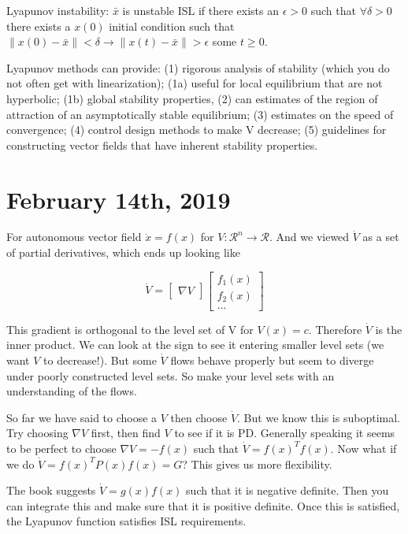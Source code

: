 \documentclass[11pt]{article}
\newcommand{\norm}[1]{\left\lVert#1\right\rVert}
\begin{document}
Lyapunov instability: $\bar{x}$ is unstable ISL if there exists an $\epsilon > 0$ such that $\forall \delta >0$  there exists a $x(0)$ initial condition such that $\norm{x(0) - \bar{x}}<\delta \rightarrow \norm{x(t) - \bar{x}} > \epsilon$ some $t\geq 0$. 

Lyapunov methods can provide: (1) rigorous analysis of stability (which you do not often get with linearization); (1a) useful for local equilibrium that are not hyperbolic; (1b) global stability properties, (2) can estimates of the region of attraction of an asymptotically stable equilibrium; (3) estimates on the speed of convergence; (4) control design methods to make V decrease; (5) guidelines for constructing vector fields that have inherent stability properties.




\section*{February 14th, 2019}
For autonomous vector field $\dot{x}=f(x)$ for $V:\mathcal{R}^n \rightarrow \mathcal{R}$. And we viewed $\dot{V}$ as a set of partial derivatives, which ends up looking like

\begin{equation}
\dot{V}=
\begin{bmatrix}
\nabla V
\end{bmatrix}
\begin{bmatrix}
f_1(x) \\
f_2(x) \\
...
\end{bmatrix}
\end{equation}

This gradient is orthogonal to the level set of V for $V(x)=c$. Therefore $\dot{V}$ is the inner product. We can look at the sign to see it entering smaller level sets (we want $V$ to decrease!). But some $\dot{V}$ flows behave properly but seem to diverge under poorly constructed level sets. So make your level sets with an understanding of the flows.

So far we have said to choose a $V$ then choose $\dot{V}$. But we know this is suboptimal. Try choosing $\nabla V$ first, then find $V$ to see if it is PD. Generally speaking it seems to be perfect to choose $\nabla{V} = -f(x)$ such that $\dot{V} = f(x)^Tf(x)$. Now what if we do $\dot{V} = f(x)^TP(x)f(x) = G$? This gives us more flexibility.

The book suggests $\dot{V} = g(x)f(x)$ such that it is negative definite. Then you can integrate this and make sure that it is positive definite. Once this is satisfied, the Lyapunov function satisfies ISL requirements.
\end{document}
